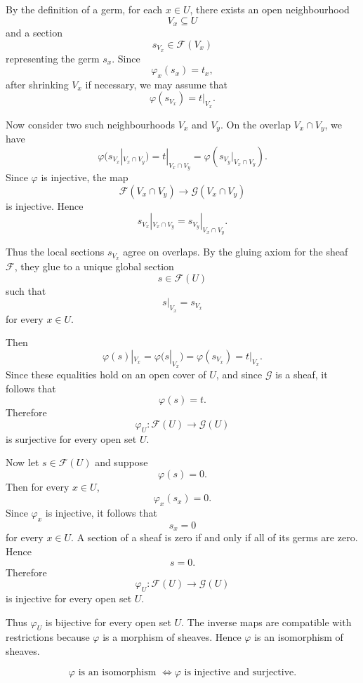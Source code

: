 By the definition of a germ, for each \(x\in U\), there exists an open neighbourhood
\[
V_x\subseteq U
\]
and a section
\[
s_{V_x}\in \mathcal{F}(V_x)
\]
representing the germ \(s_x\). Since
\[
\varphi_x(s_x)=t_x,
\]
after shrinking \(V_x\) if necessary, we may assume that
\[
\varphi(s_{V_x})=t|_{V_x}.
\]

Now consider two such neighbourhoods \(V_x\) and \(V_y\). On the overlap \(V_x\cap V_y\), we have
\[
\varphi(s_{V_x}|_{V_x\cap V_y})
=
t|_{V_x\cap V_y}
=
\varphi(s_{V_y}|_{V_x\cap V_y}).
\]
Since \(\varphi\) is injective, the map
\[
\mathcal{F}(V_x\cap V_y)\longrightarrow \mathcal{G}(V_x\cap V_y)
\]
is injective. Hence
\[
s_{V_x}|_{V_x\cap V_y}
=
s_{V_y}|_{V_x\cap V_y}.
\]

Thus the local sections \(s_{V_x}\) agree on overlaps. By the gluing axiom for the sheaf \(\mathcal{F}\), they glue to a unique global section
\[
s\in \mathcal{F}(U)
\]
such that
\[
s|_{V_x}=s_{V_x}
\]
for every \(x\in U\).

Then
\[
\varphi(s)|_{V_x}
=
\varphi(s|_{V_x})
=
\varphi(s_{V_x})
=
t|_{V_x}.
\]
Since these equalities hold on an open cover of \(U\), and since \(\mathcal{G}\) is a sheaf, it follows that
\[
\varphi(s)=t.
\]
Therefore
\[
\varphi_U:\mathcal{F}(U)\longrightarrow \mathcal{G}(U)
\]
is surjective for every open set \(U\).

Now let \(s\in \mathcal{F}(U)\) and suppose
\[
\varphi(s)=0.
\]
Then for every \(x\in U\),
\[
\varphi_x(s_x)=0.
\]
Since \(\varphi_x\) is injective, it follows that
\[
s_x=0
\]
for every \(x\in U\). A section of a sheaf is zero if and only if all of its germs are zero. Hence
\[
s=0.
\]
Therefore
\[
\varphi_U:\mathcal{F}(U)\longrightarrow \mathcal{G}(U)
\]
is injective for every open set \(U\).

Thus \(\varphi_U\) is bijective for every open set \(U\). The inverse maps are compatible with restrictions because \(\varphi\) is a morphism of sheaves. Hence \(\varphi\) is an isomorphism of sheaves.

\[
\boxed{
	\varphi \text{ is an isomorphism }
	\Longleftrightarrow
	\varphi \text{ is injective and surjective.}
}
\]
